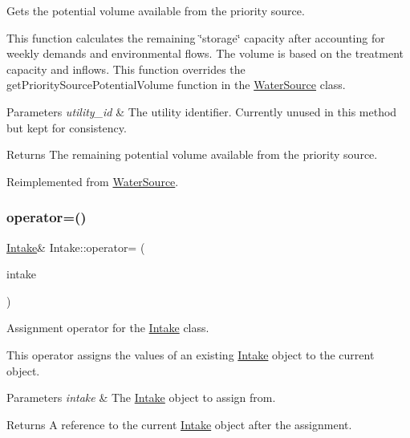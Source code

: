 Gets the potential volume available from the priority source. 

This function calculates the remaining \char`\"{}storage\char`\"{} capacity after accounting for weekly demands and environmental flows. The volume is based on the treatment capacity and inflows. This function overrides the get\+Priority\+Source\+Potential\+Volume function in the \mbox{\hyperlink{classWaterSource}{Water\+Source}} class.


\begin{DoxyParams}{Parameters}
{\em utility\+\_\+id} & The utility identifier. Currently unused in this method but kept for consistency.\\
\hline
\end{DoxyParams}
\begin{DoxyReturn}{Returns}
The remaining potential volume available from the priority source. 
\end{DoxyReturn}


Reimplemented from \mbox{\hyperlink{classWaterSource_a00a432eba75eaae7195338a8514ac853}{Water\+Source}}.

\mbox{\label{classIntake_aa4a7adbb8380d091197011d9f1877005}} 
\subsubsection{\texorpdfstring{operator=()}{operator=()}}
{\footnotesize\ttfamily \mbox{\hyperlink{classIntake}{Intake}}\& Intake\+::operator= (\begin{DoxyParamCaption}\item[{const \mbox{\hyperlink{classIntake}{Intake}} \&}]{intake }\end{DoxyParamCaption})}



Assignment operator for the \mbox{\hyperlink{classIntake}{Intake}} class. 

This operator assigns the values of an existing \mbox{\hyperlink{classIntake}{Intake}} object to the current object.


\begin{DoxyParams}{Parameters}
{\em intake} & The \mbox{\hyperlink{classIntake}{Intake}} object to assign from.\\
\hline
\end{DoxyParams}
\begin{DoxyReturn}{Returns}
A reference to the current \mbox{\hyperlink{classIntake}{Intake}} object after the assignment. 
\end{DoxyReturn}
\mbox{\label{classIntake_a879c4c780a4d21606e848f57464cf3b6}} 
